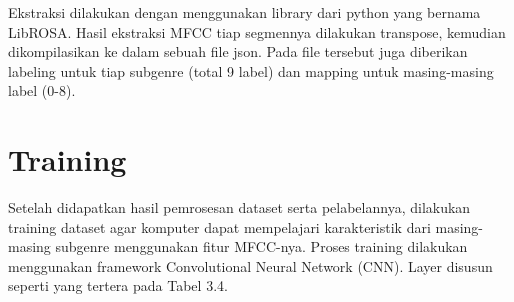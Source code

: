 Ekstraksi dilakukan dengan menggunakan library dari python yang bernama LibROSA. Hasil ekstraksi MFCC tiap segmennya dilakukan transpose, kemudian dikompilasikan ke dalam sebuah file json. Pada file tersebut juga diberikan labeling untuk tiap subgenre (total 9 label) dan mapping untuk masing-masing label (0-8).

\section{Training}
\label{sec:training}

Setelah didapatkan hasil pemrosesan dataset serta pelabelannya, dilakukan training dataset agar komputer dapat mempelajari karakteristik dari masing-masing subgenre menggunakan fitur MFCC-nya. Proses training dilakukan menggunakan framework Convolutional Neural Network (CNN). Layer disusun seperti yang tertera pada Tabel 3.4.

